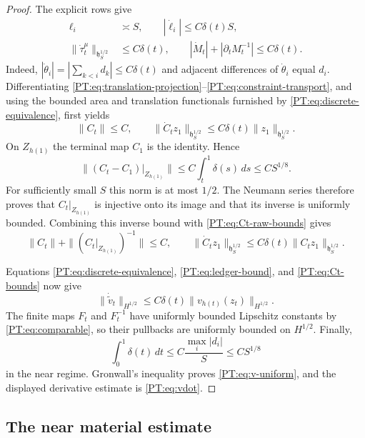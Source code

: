 \documentclass[11pt]{amsart}
\numberwithin{equation}{section}
\theoremstyle{definition}
\theoremstyle{remark}
\begin{document}
\begin{proof}
The explicit rows give
\begin{align}
 \ell_i&\asymp S,\qquad
 |\dot\ell_i|\le C\delta(t)S,\label{PT:eq:constraint-row-bounds}\\
 \|\dot\tau_t^\mu\|_{\mathfrak h^{1/2}_S}
 &\le C\delta(t),\qquad
 |\dot M_t|+|\partial_tM_t^{-1}|\le C\delta(t).
\end{align}
Indeed, $|\dot\theta_i|=|\sum_{k<i}d_k|\le C\delta(t)$ and adjacent
differences of $\dot\theta_i$ equal $d_i$.  Differentiating
\eqref{PT:eq:translation-projection}--\eqref{PT:eq:constraint-transport}, and
using the bounded area and translation functionals furnished by
\eqref{PT:eq:discrete-equivalence}, first yields
\begin{equation}\label{PT:eq:Ct-raw-bounds}
 \|C_t\|\le C,
 \qquad
 \|\dot C_tz_1\|_{\mathfrak h^{1/2}_S}
 \le C\delta(t)\|z_1\|_{\mathfrak h^{1/2}_S}.
\end{equation}
On $Z_{h(1)}$ the terminal map $C_1$ is the identity.  Hence
\[
 \|(C_t-C_1)|_{Z_{h(1)}}\|
 \le C\int_t^1\delta(s)\,ds
 \le CS^{1/8}.
\]
For sufficiently small $S$ this norm is at most $1/2$.  The Neumann
series therefore proves that $C_t|_{Z_{h(1)}}$ is injective onto its
image and that its inverse is uniformly bounded.  Combining this inverse
bound with \eqref{PT:eq:Ct-raw-bounds} gives
\begin{equation}\label{PT:eq:Ct-bounds}
 \|C_t\|+\|(C_t|_{Z_{h(1)}})^{-1}\|\le C,\qquad
 \|\dot C_tz_1\|_{\mathfrak h^{1/2}_S}
 \le C\delta(t)\|C_tz_1\|_{\mathfrak h^{1/2}_S}.
\end{equation}

Equations \eqref{PT:eq:discrete-equivalence},
\eqref{PT:eq:ledger-bound}, and \eqref{PT:eq:Ct-bounds} now give
\[
 \|\dot{\widetilde v}_t\|_{H^{1/2}}
 \le C\delta(t)\|v_{h(t)}(z_t)\|_{H^{1/2}}.
\]
The finite maps $F_t$ and $F_t^{-1}$ have uniformly bounded Lipschitz
constants by \eqref{PT:eq:comparable}, so their pullbacks are uniformly
bounded on $H^{1/2}$.  Finally,
\begin{equation}\label{PT:eq:delta-integral}
 \int_0^1\delta(t)\,dt
 \le C\frac{\max_i|d_i|}{S}\le CS^{1/8}
\end{equation}
in the near regime.  Gronwall's inequality proves
\eqref{PT:eq:v-uniform}, and the displayed derivative estimate is
\eqref{PT:eq:vdot}.
\end{proof}

\subsection{The near material estimate}
\end{document}
